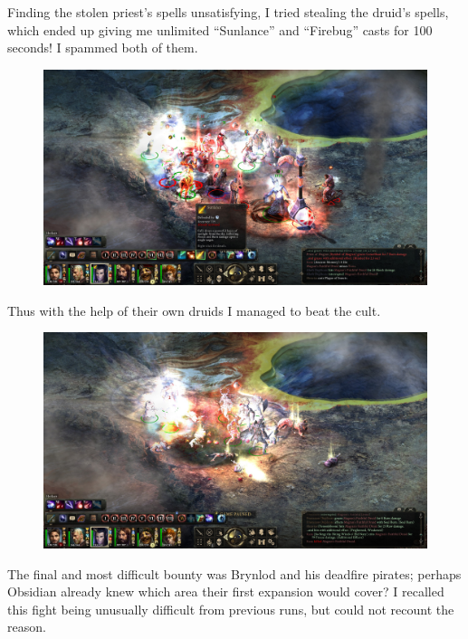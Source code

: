 \documentclass{article}
\begin{document}
Finding the stolen priest's spells unsatisfying, I tried stealing the druid's spells, which ended up giving me unlimited ``Sunlance'' and ``Firebug'' casts for 100 seconds!  I spammed both of them.

\begin{figure}
\includegraphics[scale=0.33]{files/blog/2020_01_18_poe_potd_wmpt2/2020_01_18_bounty3_3.jpg}
\end{figure}

Thus with the help of their own druids I managed to beat the cult.

\begin{figure}
\includegraphics[scale=0.33]{files/blog/2020_01_18_poe_potd_wmpt2/2020_01_18_bounty3_4.jpg}
\end{figure}

The final and most difficult bounty was Brynlod and his deadfire pirates; perhaps Obsidian already knew which area their first expansion would cover?  I recalled this fight being unusually difficult from previous runs, but could not recount the reason.
\end{document}
